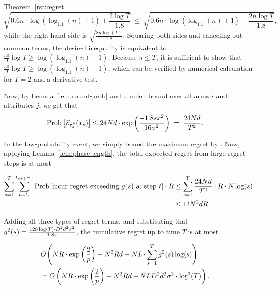 \begin{extraproof}{Theorem~\ref{rst:regret}}
\[
  \sqrt{0.6 n \cdot \log (\log_{1.1}(n) + 1) + \frac{2 \log T}{1.8}}
  \; \leq \;
  \sqrt{0.6 n \cdot \log (\log_{1.1}(n) + 1) + \frac{2 n \log T}{1.8}},
\]
while the right-hand side is $\sqrt{\frac{8 n \log(T)}{1.8}}$.
Squaring both sides and canceling out common terms,
the desired inequality is equivalent to
$\frac{50}{9} \log T \geq \log(\log_{1.1}(n) + 1)$.
Because $n \leq T$, it is sufficient to show that
$\frac{50}{9} \log T \geq \log(\log_{1.1}(n) + 1)$,
which can be verified by numerical calculation for $T=2$ and a
derivative test.

Now, by Lemma~\ref{lem:round-prob} and a union bound over all arms $i$
and attributes $j$, we get that 
\begin{align*}
\Prob{\AccEU{\tau_s^k}{x_s}}
& \leq 24 \ARMNUM d \cdot \exp \left( \frac{-1.8 s x^2}{16 \sigma^2} \right)
\; = \; \frac{24 \ARMNUM d}{T^2}.
\end{align*}

In the low-probability event, we simply 
bound the maximum regret by \MAXR.
Now, applying Lemma~\ref{lem:phase-length},
the total expected regret from large-regret steps is at most

\begin{align*}
\sum_{s = 1}^T \sum_{t=t_s}^{t_{s+1}-1}
  \Prob{\mbox{incur regret exceeding } g(s) \mbox{ at step } t} \cdot \MAXR
& \leq
 \sum_{s = 1}^T \frac{24 \ARMNUM d}{T^2} \cdot \MAXR \cdot \ARMNUM \log(s)
\\ & \leq 12 \ARMNUM^2 d \MAXR.
\end{align*}

Adding all three types of regret terms,
and substituting that 
$g^2(s) = \frac{128\log(T) \cdot D^2 d^2 \sigma^2}{1.8 s}$,
the cumulative regret up to time $T$ is at most

\begin{align*}
\lefteqn{
O \left(\ARMNUM \MAXR \cdot \exp \left( \frac{2}{p} \right)
+ \ARMNUM^2 \MAXR d
+ \ARMNUM \TieDensity \cdot \sum_{s=1}^{T} g^2(s) \log(s) \right)}
\\ & = 
O \left(\ARMNUM \MAXR \cdot \exp \left( \frac{2}{p} \right)
+ \ARMNUM^2 \MAXR d
+ \ARMNUM \TieDensity \Diam^2 d^2 \sigma^2 \cdot \log^3(T) \right).
\end{align*}
\end{extraproof}
